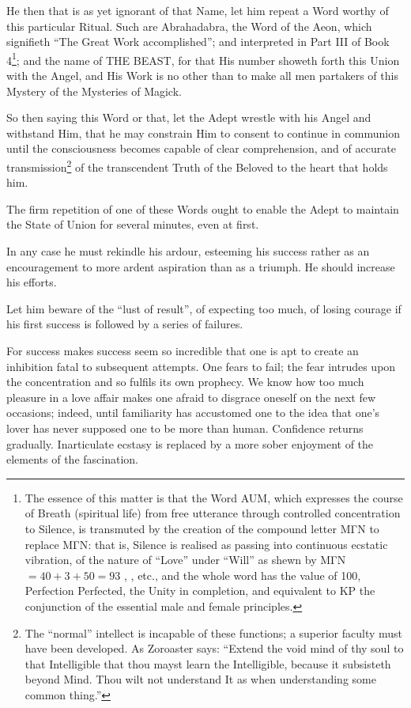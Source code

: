 He then that is as yet ignorant of that Name, let him repeat a Word worthy of this particular Ritual. Such are Abrahadabra, the Word of the Aeon, which signifieth \enquote{The Great Work accomplished}; and \Aumgn{} interpreted in Part III of Book 4\footnote{The essence of this matter is that the Word AUM, which expresses the course of Breath (spiritual life) from free utterance through controlled concentration to Silence, is transmuted by the creation of the compound letter \textgreek{ΜΓΝ} to replace \textgreek{ΜΓΝ}: that is, Silence is realised as passing into continuous ecstatic vibration, of the nature of \enquote{Love} under \enquote{Will} as shewn by \textgreek{ΜΓΝ} $ = 40+3+50=93$ \Agape{}, \Thelema{}, etc., and the whole word has the value of 100, Perfection Perfected, the Unity in completion, and equivalent to KP the conjunction of the essential male and female principles.}; and the name of THE BEAST, for that His number showeth forth this Union with the Angel, and His Work is no other than to make all men partakers of this Mystery of the Mysteries of Magick.

So then saying this Word or that, let the Adept wrestle with his Angel and withstand Him, that he may constrain Him to consent to continue in communion until the consciousness becomes capable of clear comprehension, and of accurate transmission\footnote{The \enquote{normal} intellect is incapable of these functions; a superior faculty must have been developed. As Zoroaster says: \enquote{Extend the void mind of thy soul to that Intelligible that thou mayst learn the Intelligible, because it subsisteth beyond Mind. Thou wilt not understand It as when understanding some common thing.}} of the transcendent Truth of the Beloved to the heart that holds him.

The firm repetition of one of these Words ought to enable the Adept to maintain the State of Union for several minutes, even at first.

In any case he must rekindle his ardour, esteeming his success rather as an encouragement to more ardent aspiration than as a triumph. He should increase his efforts.

Let him beware of the \enquote{lust of result}, of expecting too much, of losing courage if his first success is followed by a series of failures.

For success makes success seem so incredible that one is apt to create an inhibition fatal to subsequent attempts. One fears to fail; the fear intrudes upon the concentration and so fulfils its own prophecy. We know how too much pleasure in a love affair makes one afraid to disgrace oneself on the next few occasions; indeed, until familiarity has accustomed one to the idea that one's lover has never supposed one to be more than human. Confidence returns gradually. Inarticulate ecstasy is replaced by a more sober enjoyment of the elements of the fascination.

